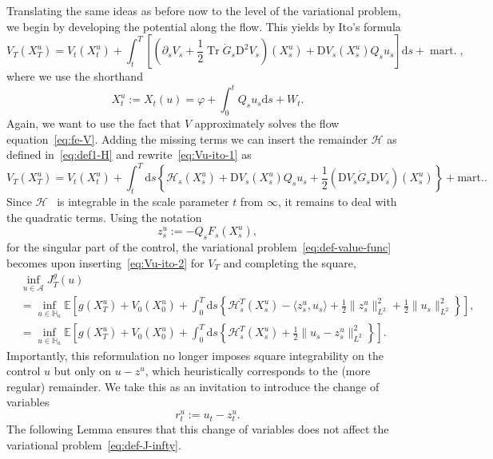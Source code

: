 \documentclass[11pt, a4paper]{scrartcl}
\numberwithin{equation}{section}
\theoremstyle{plain}
\theoremstyle{remark}
\newcommand{\assign}{:=}
\newcommand{\mathD}{\mathrm{D}}
\newcommand{\mathd}{\mathrm{d}}
\newcommand{\tmop}[1]{\ensuremath{\operatorname{#1}}}
\begin{document}
Translating the same ideas as before now to the level of the variational
problem, we begin by developing the potential along the flow. This yields by
Ito's formula
\begin{equation}
	V_T (X_T^u) = V_t (X_t^u) + \int_t^T \left[ \left( \partial_s V_s +
		\frac{1}{2} \tmop{Tr} \dot{G}_s \mathD^2 V_s \right) (X_s^u) + \mathD V_s
		(X^u_s) Q_s u_s \right] \mathd s + \tmop{mart.}, \label{eq:Vu-ito-1}
\end{equation}
where we use the shorthand
\[ X_t^u \assign X_t (u) = \varphi + \int_0^t Q_s
	u_s \mathd s + W_t . \]
Again, we want to use the fact that $V$ approximately solves the flow
equation~\eqref{eq:fe-V}. Adding the missing terms we can insert the remainder
$\mathcal{H}$ as defined in~\eqref{eq:def1-H} and rewrite~\eqref{eq:Vu-ito-1}
as
\begin{equation}
	V_T (X_T^u) = V_t (X_t^u) + \int_t^T \mathd s \left\{ \mathcal{H}_s (X_s^u)
	+ \mathD V_s (X^u_s) Q_s u_s + \frac{1}{2} (\mathD V_s  \dot{G}_s \mathD
	V_s) (X_s^u) \right\} + \text{mart.} \label{eq:Vu-ito-2} .
\end{equation}
Since $\mathcal{H}$ \ is integrable in the scale parameter $t$ from $\infty$,
it remains to deal with the quadratic terms. Using the notation
\[ z^u_s \assign - Q_s F_s (X^u_s), \]
for the singular part of the control, the variational
problem~\eqref{eq:def-value-func} becomes upon inserting~\eqref{eq:Vu-ito-2}
for $V_T$ and completing the square,
\begin{equation}
	\begin{aligned}
		 & \inf_{u \in \mathcal{A}} J_T^g (u)                                    \\ &= \inf_{u \in \mathbb{H}_a}
		\mathbb{E} \left[ g (X_T^u) + V_0 (X_0^u) + \int_0^T \mathd s \left\{
			\mathcal{H}^T_s \left( X_s^u \right) - \langle z_s^u, u_s \rangle +
			\frac{1}{2} \| z^u_s \|_{L^2}^2 + \frac{1}{2} \| u_s \|^2_{L^2} \right\}
		\right],                                                                 \\
		 & = \inf_{u \in \mathbb{H}_a} \mathbb{E} \left[ g (X_T^u) + V_0 (X_0^u)
			+ \int_0^T \mathd s \left\{ \mathcal{H}^T_s (X_s^u) + \frac{1}{2} \| u_s -
			z^u_s \|^2_{L^2} \right\} \right] .
	\end{aligned} \label{eq:def-J-infty}
\end{equation}
Importantly, this reformulation no longer imposes square integrability on the
control $u$ but only on $u - z^u$, which heuristically corresponds to the
(more regular) remainder. We take this as an invitation to introduce the
change of variables
\begin{equation}
	r_t^u \assign u_t - z^u_t . \label{eq:def-ru}
\end{equation}
The following Lemma ensures that this change of variables does not affect the
variational problem~\eqref{eq:def-J-infty}.
\end{document}
